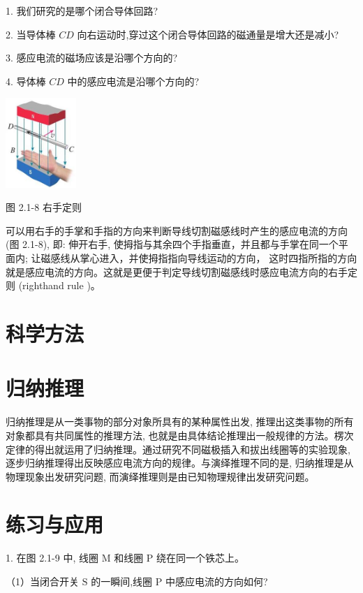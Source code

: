 \documentclass[10pt]{article}
\begin{document}
1. 我们研究的是哪个闭合导体回路?

2. 当导体棒 \({CD}\) 向右运动时,穿过这个闭合导体回路的磁通量是增大还是减小?

3. 感应电流的磁场应该是沿哪个方向的?

4. 导体棒 \({CD}\) 中的感应电流是沿哪个方向的?

\begin{center}
\includegraphics[max width=0.2\textwidth]{images/01910e72-c5b7-7ed5-a6d4-fb3a5faefc32_33_691887.jpg}
\end{center}

图 2.1-8 右手定则

可以用右手的手掌和手指的方向来判断导线切割磁感线时产生的感应电流的方向 (图 2.1-8), 即: 伸开右手, 使拇指与其余四个手指垂直，并且都与手掌在同一个平面内; 让磁感线从掌心进入，并使拇指指向导线运动的方向， 这时四指所指的方向就是感应电流的方向。这就是更便于判定导线切割磁感线时感应电流方向的右手定则 (righthand rule )。

\section*{科学方法}

\section*{归纳推理}

归纳推理是从一类事物的部分对象所具有的某种属性出发, 推理出这类事物的所有对象都具有共同属性的推理方法, 也就是由具体结论推理出一般规律的方法。楞次定律的得出就运用了归纳推理。通过研究不同磁极插入和拔出线圈等的实验现象, 逐步归纳推理得出反映感应电流方向的规律。与演绎推理不同的是, 归纳推理是从物理现象出发研究问题, 而演绎推理则是由已知物理规律出发研究问题。

\section*{练习与应用}

1. 在图 2.1-9 中, 线圈 \(\mathrm{M}\) 和线圈 \(\mathrm{P}\) 绕在同一个铁芯上。

（1）当闭合开关 \(\mathrm{S}\) 的一瞬间,线圈 \(\mathrm{P}\) 中感应电流的方向如何?
\end{document}
